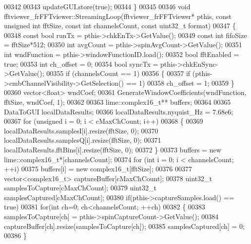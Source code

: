 \begin{DoxyCode}
{{{00342 
00343     updateGUI.store(\textcolor{keyword}{true});
00344 \}
00345 
00346 \textcolor{keywordtype}{void} fftviewer_frFFTviewer::StreamingLoop(fftviewer_frFFTviewer* pthis, \textcolor{keyword}{const} \textcolor{keywordtype}{unsigned} \textcolor{keywordtype}{int} fftSize, \textcolor{keyword}{const} \textcolor{keywordtype}{
      int} channelsCount, \textcolor{keyword}{const} uint32\_t format)
00347 \{
00348     \textcolor{keyword}{const} \textcolor{keywordtype}{bool} runTx = pthis->chkEnTx->GetValue();
00349     \textcolor{keyword}{const} \textcolor{keywordtype}{int} fifoSize = fftSize*512;
00350     \textcolor{keywordtype}{int} avgCount = pthis->spinAvgCount->GetValue();
00351     \textcolor{keywordtype}{int} wndFunction = pthis->windowFunctionID.load();
00352     \textcolor{keywordtype}{bool} fftEnabled = \textcolor{keyword}{true};
00353     \textcolor{keywordtype}{int} ch\_offset = 0;
00354     \textcolor{keywordtype}{bool} syncTx = pthis->chkEnSync->GetValue();
00355     \textcolor{keywordflow}{if} (channelsCount == 1)
00356     \{
00357         \textcolor{keywordflow}{if} (pthis->cmbChannelVisibility->GetSelection() == 1)
00358             ch\_offset = 1;
00359     \}
00360     vector<float> wndCoef;
00361     GenerateWindowCoefficients(wndFunction, fftSize, wndCoef, 1);
00362 
00363     lime::complex16_t** buffers;
00364 
00365     DataToGUI localDataResults;
00366     localDataResults.nyquist_Hz = 7.68e6;
00367     \textcolor{keywordflow}{for} (\textcolor{keywordtype}{unsigned} i = 0; i < cMaxChCount; i++)
00368     \{
00369         localDataResults.samplesI[i].resize(fftSize, 0);
00370         localDataResults.samplesQ[i].resize(fftSize, 0);
00371         localDataResults.fftBins[i].resize(fftSize, 0);
00372     \}
00373     buffers = \textcolor{keyword}{new} lime::complex16_t*[channelsCount];
00374     \textcolor{keywordflow}{for} (\textcolor{keywordtype}{int} i = 0; i < channelsCount; ++i)
00375         buffers[i] = \textcolor{keyword}{new} complex16_t[fftSize];
00376 
00377     vector<complex16\_t> captureBuffer[cMaxChCount];
00378     uint32\_t samplesToCapture[cMaxChCount];
00379     uint32\_t samplesCaptured[cMaxChCount];
00380     \textcolor{keywordflow}{if}(pthis->captureSamples.load() == \textcolor{keyword}{true})
00381         \textcolor{keywordflow}{for}(\textcolor{keywordtype}{int} ch=0; ch<channelsCount; ++ch)
00382         \{
00383             samplesToCapture[ch] = pthis->spinCaptureCount->GetValue();
00384             captureBuffer[ch].resize(samplesToCapture[ch]);
00385             samplesCaptured[ch] = 0;
00386         \}
}}}
\end{DoxyCode}
